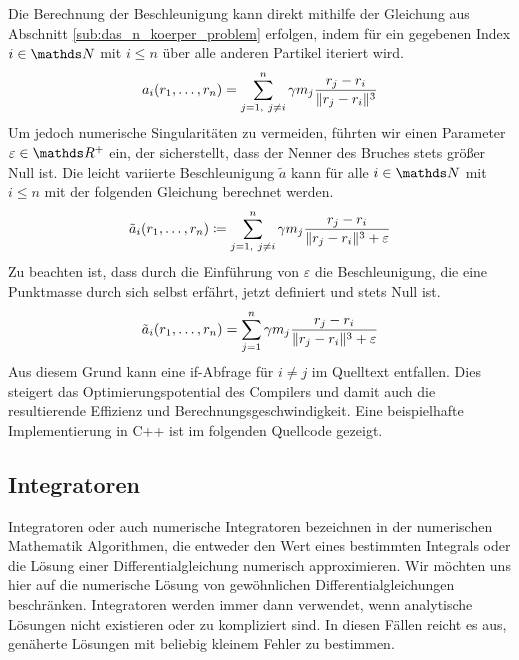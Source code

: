     Die Berechnung der Beschleunigung kann direkt mithilfe der Gleichung aus Abschnitt \ref{sub:das_n_koerper_problem} erfolgen, indem für ein gegebenen Index $i\in\setNatural$ mit $i\leq n$ über alle anderen Partikel iteriert wird.
    \[
      a_i(r_1,\ldots,r_n) = \sum_{{j=1,\ j\neq i}}^n \gamma m_j \frac{r_j-r_i}{\|r_j-r_i\|^3}
    \]
    Um jedoch numerische Singularitäten zu vermeiden, führten wir einen Parameter $\varepsilon\in\setReal^+$ ein, der sicherstellt, dass der Nenner des Bruches stets größer Null ist.
    Die leicht variierte Beschleunigung $\tilde{a}$ kann für alle $i\in\setNatural$ mit $i\leq n$ mit der folgenden Gleichung berechnet werden.
    \[
      \tilde{a}_i(r_1,\ldots,r_n)\define \sum_{{j=1,\ j\neq i}}^n \gamma m_j \frac{r_j-r_i}{\norm{r_j-r_i}^3 + \varepsilon}
    \]
    Zu beachten ist, dass durch die Einführung von $\varepsilon$ die Beschleunigung, die eine Punktmasse durch sich selbst erfährt, jetzt definiert und stets Null ist.
    \[
      \tilde{a}_i(r_1,\ldots,r_n) = \sum_{{j=1}}^n \gamma m_j \frac{r_j-r_i}{\|r_j-r_i\|^3 + \varepsilon}
    \]
    Aus diesem Grund kann eine if-Abfrage für $i\neq j$ im Quelltext entfallen.
    Dies steigert das Optimierungspotential des Compilers und damit auch die resultierende Effizienz und Berechnungsgeschwindigkeit.
    Eine beispielhafte Implementierung in C++ ist im folgenden Quellcode gezeigt.

    \medskip
    \begin{tcolorbox}[colframe=black,colbacktitle=white,coltitle=black, attach boxed title to top center={yshift=-2mm},enhanced, titlerule=0.1pt, boxrule=0.5pt, arc=5pt,title=Quelltext:\quad Partikel-Beschleunigung, breakable]
      
    \end{tcolorbox}


  \subsection{Integratoren} %
  \label{sub:integratoren}

    Integratoren oder auch numerische Integratoren bezeichnen in der numerischen Mathematik Algorithmen, die entweder den Wert eines bestimmten Integrals oder die Lösung einer Differentialgleichung numerisch approximieren.
    Wir möchten uns hier auf die numerische Lösung von gewöhnlichen Differentialgleichungen beschränken.
    Integratoren werden immer dann verwendet, wenn analytische Lösungen nicht existieren oder zu kompliziert sind.
    In diesen Fällen reicht es aus, genäherte Lösungen mit beliebig kleinem Fehler zu bestimmen.

